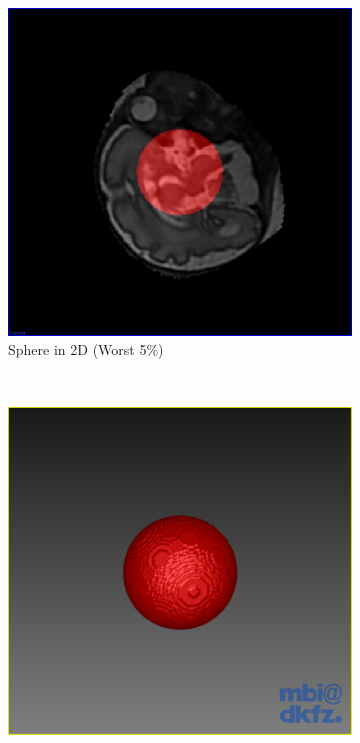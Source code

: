 \begin{figure}[H]
  \centering
  \begin{subfigure}[b]{0.5\textwidth}
    \includegraphics[width=\textwidth]{images/thresholding/results/sphere_2d.png}
    \caption{Sphere in 2D (Worst 5$\%$)}
    \label{fig:thresholdingresultssphere2d}
  \end{subfigure}%
  ~ %
  \begin{subfigure}[b]{0.5\textwidth}
    \includegraphics[width=\textwidth]{images/thresholding/results/sphere_3d.png}

\end{subfigure}
\end{figure}
